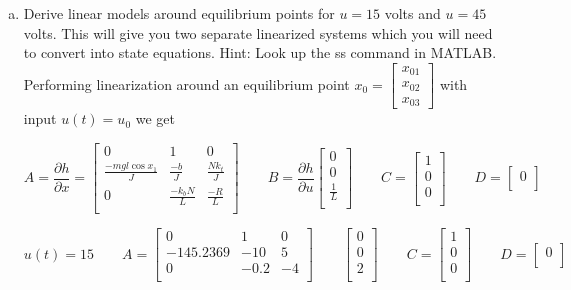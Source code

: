\documentclass{article}
\begin{document}
\begin{enumerate}[a)]
\item Derive linear models around equilibrium points for $u = 15$ volts and $u = 45$ volts.
This will give you two separate linearized systems which you will need to convert into state equations.
Hint: Look up the ss command in MATLAB.
\newline
Performing linearization around an equilibrium point $x_0 = \begin{bmatrix} x_{01} \\ x_{02} \\ x_{03} \end{bmatrix} $ with input $u(t) = u_0$ we get

$$
A = \frac{\partial h}{\partial x}
=
\begin{bmatrix}
0 & 1 & 0 \\
\frac{-mgl\cos{x_1}}{J} & \frac{-b}{J} & \frac{Nk_t}{J} \\
0 & \frac{-k_bN}{L} & \frac{-R}{L} \\
\end{bmatrix}
\qquad
B = \frac{\partial h}{\partial u}
\begin{bmatrix}
0 \\
0 \\
\frac{1}{L} \\
\end{bmatrix}
\qquad
C =
\begin{bmatrix}
1 \\
0 \\
0 \\
\end{bmatrix}
\qquad
D =
\begin{bmatrix}
0 \\
\end{bmatrix}
$$

$$
u(t) = 15
\qquad
A
=
\begin{bmatrix}
0 & 1 & 0 \\
-145.2369 & -10 & 5 \\
0 & -0.2 & -4 \\
\end{bmatrix}
\qquad
\begin{bmatrix}
0 \\
0 \\
2 \\
\end{bmatrix}
\qquad
C =
\begin{bmatrix}
1 \\
0 \\
0 \\
\end{bmatrix}
\qquad
D =
\begin{bmatrix}
0 \\
\end{bmatrix}
$$


\end{enumerate}
\end{document}
